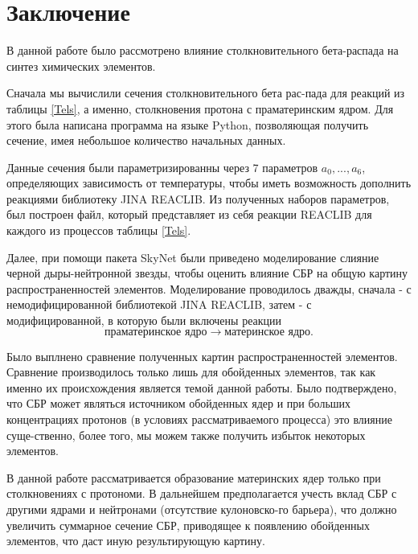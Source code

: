 \documentclass[14pt, a4paper]{article}
\numberwithin{figure}{section}
\numberwithin{equation}{section}
\begin{document}
\section*{\centering Заключение}
В данной работе было рассмотрено влияние столкновительного бета-распада на синтез химических элементов.

Сначала мы вычислили сечения столкновительного бета рас-пада для реакций из таблицы \ref{Tels}, а именно, столкновения протона с праматеринским ядром. Для этого была написана программа на языке Python, позволяющая получить сечение, имея небольшое количество начальных данных.

Данные сечения были параметризированны через 7 параметров $a_0, ..., a_6$, определяющих зависимость от температуры, чтобы иметь возможность дополнить реакциями библиотеку JINA REACLIB. Из полученных наборов параметров, был построен файл, который представляет из себя реакции REACLIB для каждого из процессов таблицы \ref{Tels}.


Далее, при помощи пакета SkyNet были приведено моделирование слияние черной дыры-нейтронной звезды, чтобы оценить влияние СБР на общую картину распространенностей элементов. Моделирование проводилось дважды, сначала - с немодифицированной библиотекой JINA REACLIB, затем - с модифицированной, в которую были включены реакции $$\text{праматеринское ядро} \to \text{материнское ядро}.$$

Было выплнено сравнение полученных картин распространенностей элементов.  Сравнение производилось только лишь для обойденных элементов, так как именно их происхождения является темой данной работы. Было подтверждено, что СБР может являться источником обойденных ядер и при больших концентрациях протонов (в условиях рассматриваемого процесса) это влияние суще-ственно, более того, мы можем также получить избыток некоторых элементов.

В данной работе рассматривается образование материнских ядер только при столкновениях с протономи. В дальнейшем предполагается учесть вклад СБР с другими ядрами и нейтронами (отсутствие кулоновско-го барьера), что должно увеличить суммарное сечение СБР, приводящее к появлению обойденных элементов, что даст иную результирующую картину.

\newpage
{}


\end{document}
